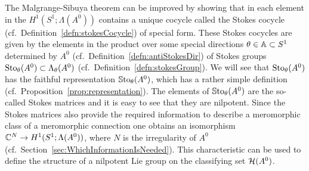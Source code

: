The Malgrange-Sibuya theorem can be improved by showing that in each element
in the $H^1(S^1;\Lambda(A^0))$ contains a unique cocycle called the Stokes
cocycle (cf.\ Definition~\ref{defn:stokesCocycle}) of special form.
These Stokes cocycles are given by the elements in the product over some
special directions $\theta\in\mathbb{A}\subset S^1$ determined by $A^0$
(cf.\ Definition~\ref{defn:antiStokesDir}) of Stokes groups
$\operatorname{Sto}_\theta(A^0)\subset\Lambda_\theta(A^0)$
(cf.\ Definition~\ref{defn:stokesGroup}).
We will see that $\operatorname{Sto}_\theta(A^0)$ has the faithful representation
$\operatorname{\mathbb{S}to}_\theta(A^0)$, which has a rather simple definition
(cf.\ Proposition~\ref{prop:representation}).
The elements of $\operatorname{\mathbb{S}to}_\theta(A^0)$ are the so-called Stokes matrices and it is
easy to see that they are nilpotent.
Since the Stokes matrices also provide the required information to describe a
meromorphic class of a meromorphic connection one obtains an isomorphism
$\mathbb{C}^N\to H^1(S^1;\Lambda(A^0))$, where $N$ is the irregularity of $A^0$
(cf.\ Section~\ref{sec:WhichInformationIsNeeded}).
This characteristic can be used to define the structure of a nilpotent Lie
group on the classifying set $\mathcal{H}(A^0)$.

